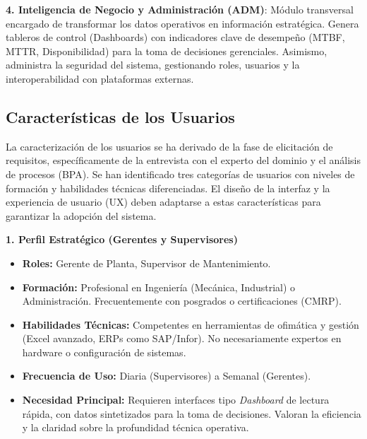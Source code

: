 \textbf{4. Inteligencia de Negocio y Administración (ADM)}: Módulo transversal encargado de transformar los datos operativos en información estratégica. Genera tableros de control (Dashboards) con indicadores clave de desempeño (MTBF, MTTR, Disponibilidad) para la toma de decisiones gerenciales. Asimismo, administra la seguridad del sistema, gestionando roles, usuarios y la interoperabilidad con plataformas externas.

\subsection{Características de los Usuarios}
La caracterización de los usuarios se ha derivado de la fase de elicitación de requisitos, específicamente de la entrevista con el experto del dominio y el análisis de procesos (BPA). Se han identificado tres categorías de usuarios con niveles de formación y habilidades técnicas diferenciadas. El diseño de la interfaz y la experiencia de usuario (UX) deben adaptarse a estas características para garantizar la adopción del sistema.

\textbf{1. Perfil Estratégico (Gerentes y Supervisores)}
\begin{itemize}
    \item \textbf{Roles:} Gerente de Planta, Supervisor de Mantenimiento.
    \item \textbf{Formación:} Profesional en Ingeniería (Mecánica, Industrial) o Administración. Frecuentemente con posgrados o certificaciones (CMRP).
    \item \textbf{Habilidades Técnicas:} Competentes en herramientas de ofimática y gestión (Excel avanzado, ERPs como SAP/Infor). No necesariamente expertos en hardware o configuración de sistemas.
    \item \textbf{Frecuencia de Uso:} Diaria (Supervisores) a Semanal (Gerentes).
    \item \textbf{Necesidad Principal:} Requieren interfaces tipo \textit{Dashboard} de lectura rápida, con datos sintetizados para la toma de decisiones. Valoran la eficiencia y la claridad sobre la profundidad técnica operativa.
\end{itemize}

